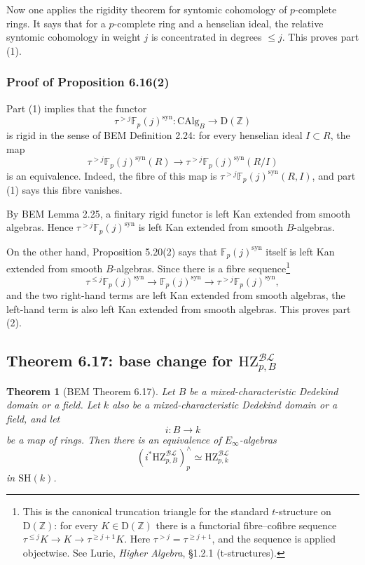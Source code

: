 \documentclass[11pt,a4paper]{article}
\newcommand{\Z}{\mathbb Z}
\newcommand{\F}{\mathbb F}
\newcommand{\SH}{\mathrm{SH}}
\newcommand{\CAlg}{\mathrm{CAlg}}
\newcommand{\D}{\mathrm{D}}
\newcommand{\BL}{\mathcal{BL}}
\newcommand{\syn}{\mathrm{syn}}
\newcommand{\HZ}{\mathrm{HZ}}
\newcommand{\1}{\mathbf 1}
\theoremstyle{bemstyle}
\newtheorem{theorem}{Theorem}[section]
\theoremstyle{definition}
\begin{document}
Now one applies the rigidity theorem for syntomic cohomology of \(p\)-complete rings. It says that for a \(p\)-complete ring and a henselian ideal, the relative syntomic cohomology in weight \(j\) is concentrated in degrees \(\leq j\). This proves part (1).

\subsubsection{Proof of Proposition 6.16(2)}

Part (1) implies that the functor
\[
  \tau^{>j}\F_p(j)^{\syn}:\CAlg_B\longrightarrow \D(\Z)
\]
is rigid in the sense of BEM Definition 2.24: for every henselian ideal \(I\subset R\), the map
\[
  \tau^{>j}\F_p(j)^{\syn}(R)
  \longrightarrow
  \tau^{>j}\F_p(j)^{\syn}(R/I)
\]
is an equivalence. Indeed, the fibre of this map is \(\tau^{>j}\F_p(j)^{\syn}(R,I)\), and part (1) says this fibre vanishes.

By BEM Lemma 2.25, a finitary rigid functor is left Kan extended from smooth algebras. Hence \(\tau^{>j}\F_p(j)^{\syn}\) is left Kan extended from smooth \(B\)-algebras.

On the other hand, Proposition 5.20(2) says that \(\F_p(j)^{\syn}\) itself is left Kan extended from smooth \(B\)-algebras. Since there is a fibre sequence\footnote{This is the canonical truncation triangle for the standard \(t\)-structure on \(\D(\Z)\): for every \(K\in\D(\Z)\) there is a functorial fibre--cofibre sequence \(\tau^{\leq j}K\to K\to\tau^{\geq j+1}K\). Here \(\tau^{>j}=\tau^{\geq j+1}\), and the sequence is applied objectwise. See Lurie, \emph{Higher Algebra}, \S1.2.1 (t-structures).}
\[
  \tau^{\leq j}\F_p(j)^{\syn}
  \longrightarrow
  \F_p(j)^{\syn}
  \longrightarrow
  \tau^{>j}\F_p(j)^{\syn},
\]
and the two right-hand terms are left Kan extended from smooth algebras, the left-hand term is also left Kan extended from smooth algebras. This proves part (2).


\subsection{Theorem 6.17: base change for \texorpdfstring{\(\HZ^{\BL}_{p,B}\)}{HZ BL}}

\begin{theorem}[BEM Theorem 6.17]
Let \(B\) be a mixed-characteristic Dedekind domain or a field. Let \(k\) also be a mixed-characteristic Dedekind domain or a field, and let
\[
  i:B\longrightarrow k
\]
be a map of rings. Then there is an equivalence of \(E_\infty\)-algebras
\[
  (i^*\HZ^{\BL}_{p,B})^\wedge_p\simeq \HZ^{\BL}_{p,k}
\]
in \(\SH(k)\).
\end{theorem}
\end{document}
